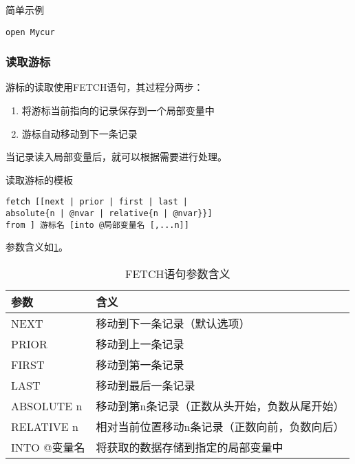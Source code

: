 \qquad 简单示例

\begin{mdframed}[backgroundcolor=gray!10]
\begin{verbatim}
open Mycur
\end{verbatim}
\end{mdframed}

\subsubsection{读取游标}

\qquad 游标的读取使用FETCH语句，其过程分两步：

\begin{enumerate}
  \item 将游标当前指向的记录保存到一个局部变量中
  \item 游标自动移动到下一条记录
\end{enumerate}

\qquad 当记录读入局部变量后，就可以根据需要进行处理。

\qquad 读取游标的模板

\begin{mdframed}[backgroundcolor=gray!10]
\begin{verbatim}
fetch [[next | prior | first | last |
absolute{n | @nvar | relative{n | @nvar}}]
from ] 游标名 [into @局部变量名 [,...n]]
\end{verbatim}
\end{mdframed}

\qquad 参数含义如\ref{table:cursor:1}。

\begin{table}[h]
  \centering
  \begin{tabular}{|l|l|}
    \hline
    \textbf{参数} & \textbf{含义} \\
    \hline
    NEXT & 移动到下一条记录（默认选项） \\
    \hline
    PRIOR & 移动到上一条记录 \\
    \hline
    FIRST & 移动到第一条记录 \\
    \hline
    LAST & 移动到最后一条记录 \\
    \hline
    ABSOLUTE n & 移动到第n条记录（正数从头开始，负数从尾开始） \\
    \hline
    RELATIVE n & 相对当前位置移动n条记录（正数向前，负数向后） \\
    \hline
    INTO @变量名 & 将获取的数据存储到指定的局部变量中 \\
    \hline
  \end{tabular}
  \caption{FETCH语句参数含义}
  \label{table:cursor:1}
\end{table}

